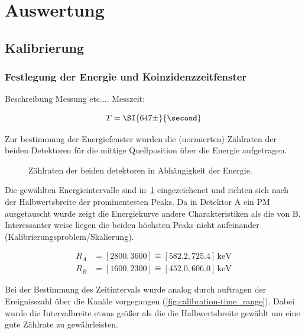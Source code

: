 \documentclass[slug=PET, room=Andreas-Schubert-Bau\,\ 424A, supervisor=Carsten\ Bittrich, coursedate=10.\ 01.\ 2020]{../../Lab_Report_LaTeX/lab_report}
\begin{document}
\section{Auswertung}
\label{sec:ausw}

\subsection{Kalibrierung}
\label{sec:kalib}

\subsubsection{Festlegung der Energie und Koinzidenzzeitfenster}
Beschreibung Messung etc....
Messzeit:

\begin{equation}
  \label{eq:caltime}
  T = \SI{647\pm}{\second}
\end{equation}

\label{sec:energkozeit}

Zur bestimmung der Energiefenster wurden die (normierten) Z\"ahlraten
der beiden Detektoren f\"ur die mittige Quellposition \"uber die
Energie aufgetragen.

\begin{figure}[h]\centering
  
  \caption{Z\"ahlraten der beiden detektoren in Abhängigkeit der Energie.}
  \label{fig:calibration-mid_over_energy}
\end{figure}

Die gew\"ahlten Energieintervalle sind
in~\ref{fig:calibration-mid_over_energy} eingezeichenet und richten
sich nach der Halbwertsbreite der prominentesten Peaks. Da in
Detektor A ein PM ausgetauscht wurde zeigt die Energiekurve andere
Charakteristiken als die von B. Interessanter weise liegen die beiden
h\"ochsten Peaks nicht aufeinander (Kalibrierungsproblem/Skalierung).

\begin{align}
  R_A &= [2800, 3600] \hat{=} [582.2, 725.4]\,\si{\kilo\electronvolt}
  \\
  R_B &= [1600, 2300] \hat{=} [452.0, 606.0]\,\si{\kilo\electronvolt}
\end{align}

Bei der Bestimmung des Zeitintervals wurde analog durch auftragen der
Ereignisszahl \"uber die Kan\"ale vorgegangen
(\ref{fig:calibration-time_range}). Dabei wurde die Intervalbreite
etwas gr\"o\ss{}er als die die Halbwertsbreite gew\"ahlt um eine gute
Z\"ahlrate zu gew\"ahrleisten.
\end{document}

